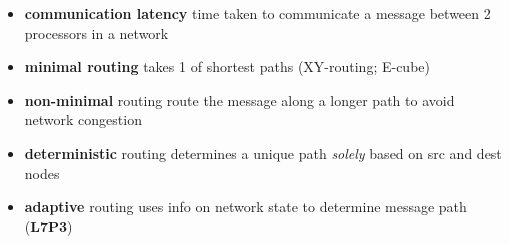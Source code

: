 \begin{itemize}
\item \textbf{communication latency} time taken to communicate a message between 2 processors in a network
\item \textbf{minimal routing} takes 1 of shortest paths (XY-routing; E-cube)
\item \textbf{non-minimal} routing route the message along a longer path to avoid network congestion
\item \textbf{deterministic} routing determines a unique path \emph{solely} based on src and dest nodes
\item \textbf{adaptive} routing uses info on network state to determine message path (\textbf{L7P3})
\end{itemize}
